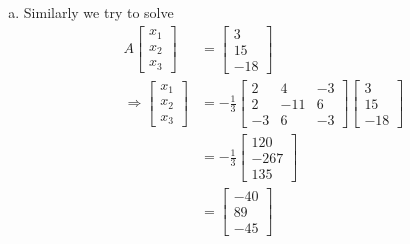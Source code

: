 \documentclass{article}
\begin{document}
\begin{enumerate}[(a)]
\item Similarly we try to solve
\begin{align*}
    A\begin{bmatrix}
        x_1\\x_2\\x_3
    \end{bmatrix} &= \begin{bmatrix}
        3\\15\\-18
    \end{bmatrix}
    \\
    \Rightarrow 
    \begin{bmatrix}
        x_1\\x_2\\x_3
    \end{bmatrix} &=  -\frac{1}{3}\begin{bmatrix}
        2&4&-3 \\
        2&-11&6 \\
        -3&6&-3
    \end{bmatrix}\begin{bmatrix}
        3\\15\\-18
    \end{bmatrix}
    \\
    &= -\frac{1}{3}\begin{bmatrix}
        120\\-267\\135
    \end{bmatrix}
    \\
    &= \begin{bmatrix}
        -40\\89\\-45
    \end{bmatrix}
\end{align*}

\end{enumerate}
\end{document}
